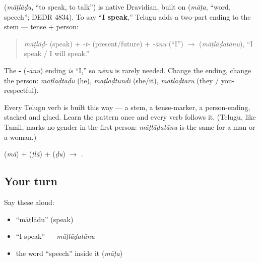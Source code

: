 \begin{cousinweb}
\textbf{} (\emph{māṭlāḍu}, \textquotedblleft{}to speak, to talk\textquotedblright{}) is native Dravidian, built on \textbf{} (\emph{māṭa}, \textquotedblleft{}word, speech\textquotedblright{}; DEDR 4834). To say \textquotedblleft{}\textbf{I speak},\textquotedblright{} Telugu adds a two-part ending to the stem — tense + person:

\begin{quote}
\emph{māṭlāḍ-} (speak) + \emph{-t-} (present/future) + \emph{-ānu} (\textquotedblleft{}I\textquotedblright{}) $\to$ \textbf{} (\emph{māṭlāḍatānu}), \textquotedblleft{}I speak / I will speak.\textquotedblright{}
\end{quote}

The \textbf{-} (\emph{-ānu}) ending \emph{is} \textquotedblleft{}I,\textquotedblright{} so \emph{nēnu} is rarely needed. Change the ending, change the person: \emph{māṭlāḍtāḍu} (he), \emph{māṭlāḍtundi} (she/it), \emph{māṭlāḍtāru} (they / you-respectful).
\end{cousinweb}

\begin{grammarlens}[title={Grammar Lens: stem + tense + person}]
Every Telugu verb is built this way — a stem, a tense-marker, a person-ending, stacked and glued. Learn the pattern once and every verb follows it. (Telugu, like Tamil, marks no gender in the first person: \emph{māṭlāḍatānu} is the same for a man or a woman.)
\end{grammarlens}

\begin{sounds}
 (\emph{mā}) +  (\emph{ṭlā}) +  (\emph{ḍu}) $\to$ .
\end{sounds}

\subsection*{Your turn}
Say these aloud:

\begin{itemize}
\raggedright
  \item \textquotedblleft{}māṭlāḍu\textquotedblright{} (speak)
  \item \textquotedblleft{}I speak\textquotedblright{} — \emph{māṭlāḍatānu}
  \item the word \textquotedblleft{}speech\textquotedblright{} inside it (\emph{māṭa})
\end{itemize}

